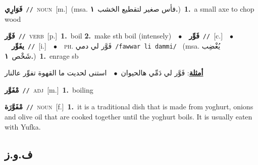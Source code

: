 \documentclass[10pt,a4paper,twoside]{article} %
\begin{document}
\begin{multicols}{2}
{\setlength\topsep{0pt}\textbf{\foreignlanguage{arabic}{فَوَارِي}}\ {\color{gray}\texttt{//}\color{black}}\ \textsc{noun}\ [m.]\ \color{gray}(msa. \foreignlanguage{arabic}{فأس صغير لتقطيع الخشب}~\foreignlanguage{arabic}{\textbf{١.}})\color{black}\ \textbf{1.}~a small axe to chop wood\ } \vspace{2mm}

{\setlength\topsep{0pt}\textbf{\foreignlanguage{arabic}{فَوَّر}}\ {\color{gray}\texttt{//}\color{black}}\ \textsc{verb}\ [p.]\ \textbf{1.}~boil  \textbf{2.}~make sth boil (intensely)\ \ $\bullet$\ \ \setlength\topsep{0pt}\textbf{\foreignlanguage{arabic}{فَوِّر}}\ {\color{gray}\texttt{//}\color{black}}\ [c.]\ \ $\bullet$\ \ \setlength\topsep{0pt}\textbf{\foreignlanguage{arabic}{يفَوِّر}}\ {\color{gray}\texttt{//}\color{black}}\ [i.]\ \ $\bullet$\ \ \textsc{ph.} \color{gray} \foreignlanguage{arabic}{فَوَّر لي دمي}\color{black}\ {\color{gray}\texttt{/{\sffamily fawwar li dammi}/}\color{black}}\ \color{gray} (msa. \foreignlanguage{arabic}{يُغْضِب شَخْص}~\foreignlanguage{arabic}{\textbf{١.}})\color{black}\ \textbf{1.}~enrage sb\  \begin{flushright}\color{gray}\foreignlanguage{arabic}{\textbf{\underline{\foreignlanguage{arabic}{أمثلة}}}: فَوَّر لي دَمِّي هالحيوان\ $\bullet$\ \  استنى لحديت ما القهوة تفوِّر عالنار}\end{flushright}\color{black}} \vspace{2mm}

{\setlength\topsep{0pt}\textbf{\foreignlanguage{arabic}{مْفَوَّر}}\ {\color{gray}\texttt{//}\color{black}}\ \textsc{adj}\ [m.]\ \textbf{1.}~boiling\ } \vspace{2mm}

{\setlength\topsep{0pt}\textbf{\foreignlanguage{arabic}{مْفَوَّرَة}}\ {\color{gray}\texttt{//}\color{black}}\ \textsc{noun}\ [f.]\ \textbf{1.}~it is a traditional dish that is made from yoghurt, onions and olive oil that are cooked together until the yoghurt boils. It is usually eaten with Yufka.\ } \vspace{2mm}

\vspace{-3mm}
\subsection*{\color{blue}\foreignlanguage{arabic}{ف.و.ز}\color{blue}{}} 


\end{multicols}
\end{document}
